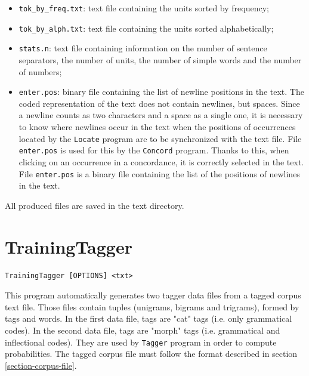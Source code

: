 \begin{itemize}
  \item \verb+tok_by_freq.txt+: text file containing the units sorted by frequency;
  \item \verb+tok_by_alph.txt+: text file containing the units sorted alphabetically;
  \item \verb+stats.n+: text file containing information on the number of
  sentence separators, the number of units, the number of simple words and the
  number of numbers;

  \item \verb+enter.pos+: binary file containing the list of newline positions in
  the text. The coded representation of the text does not contain newlines, but
  spaces. Since a newline counts as two characters and a space as a single one,
  it is necessary to know where newlines occur in the text when the positions of
  occurrences located by the \verb+Locate+ program are to be synchronized with
  the text file. File \verb+enter.pos+ is used for this by the \verb+Concord+
  program. Thanks to this, when clicking on an occurrence in a concordance, it is
  correctly selected in the text. File \verb$enter.pos$ is a binary file
  containing the list of the positions of newlines in the text.

\end{itemize}

\bigskip
\noindent All produced files are saved in the text directory.






\section{TrainingTagger}
\verb+TrainingTagger [OPTIONS] <txt>+
\label{section-TrainingTagger}

\bigskip
\noindent {}This 
program automatically generates two tagger data files from a tagged corpus text file. Those files contain tuples (unigrams, bigrams and trigrams), 
formed by tags and words. In the first data file, tags are "cat" tags (i.e. only grammatical codes). In the second data file,
tags are "morph" tags (i.e. grammatical and inflectional codes). They are used by \verb+Tagger+ program in order to compute
probabilities. The tagged corpus file must follow the format described in section \ref{section-corpus-file}.

